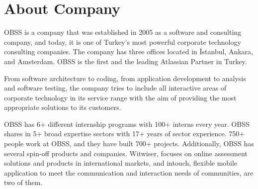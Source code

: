 \section{About Company}

OBSS is a company that was established in 2005 as a software and consulting company, and today, it is one of Turkey's most powerful corporate technology consulting companies. The company has three offices located in İstanbul, Ankara, and Amsterdam. OBSS is the first and the leading Atlassian Partner in Turkey.

From software architecture to coding, from application development to analysis and software testing, the company tries to include all interactive areas of corporate technology in its service range with the aim of providing the most appropriate solutions to its customers.

OBSS has 6+ different internship programs with 100+ interns every year. OBSS shares in 5+ broad expertise sectors with 17+ years of sector experience. 750+ people work at OBSS, and they have built 700+ projects. Additionally, OBSS has several spin-off products and companies. Witwiser, focuses on online assessment solutions and products in international markets, and intouch, flexible mobile application to meet the communication and interaction needs of communities, are two of them.
